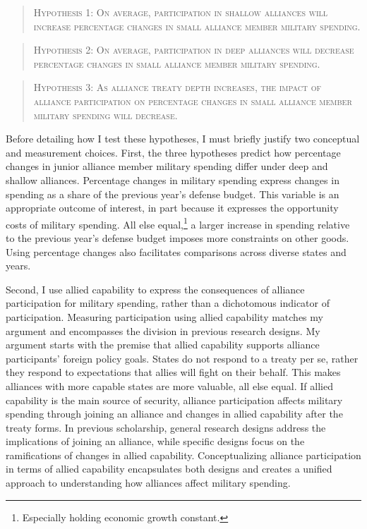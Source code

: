 \documentclass[12pt]{article}
\begin{document}
\begin{quote}
\textsc{Hypothesis 1: On average, participation in shallow alliances will increase percentage changes in small alliance member military spending.}
\end{quote}

\begin{quote}
\textsc{Hypothesis 2: On average, participation in deep alliances will decrease percentage changes in small alliance member military spending.}
\end{quote}

\begin{quote}
\textsc{Hypothesis 3: As alliance treaty depth increases, the impact of alliance participation on percentage changes in small alliance member military spending will decrease.}
\end{quote}


Before detailing how I test these hypotheses, I must briefly justify two conceptual and measurement choices. 
First, the three hypotheses predict how percentage changes in junior alliance member military spending differ under deep and shallow alliances. 
Percentage changes in military spending express changes in spending as a share of the previous year's defense budget.
This variable is an appropriate outcome of interest, in part because it expresses the opportunity costs of military spending. 
All else equal,\footnote{Especially holding economic growth constant.} a larger increase in spending relative to the previous year's defense budget imposes more constraints on other goods. 
Using percentage changes also facilitates comparisons across diverse states and years. 


Second, I use allied capability to express the consequences of alliance participation for military spending, rather than a dichotomous indicator of participation.
Measuring participation using allied capability matches my argument and encompasses the division in  previous research designs. 
My argument starts with the premise that allied capability supports alliance participants' foreign policy goals. 
States do not respond to a treaty per se, rather they respond to expectations that allies will fight on their behalf.
This makes alliances with more capable states are more valuable, all else equal.
If allied capability is the main source of security, alliance participation affects military spending through joining an alliance and changes in allied capability after the treaty forms. 
In previous scholarship, general research designs address the implications of joining an alliance, while specific designs focus on the ramifications of changes in allied capability. 
Conceptualizing alliance participation in terms of allied capability encapsulates both designs and creates a unified approach to understanding how alliances affect military spending. 
\end{document}
